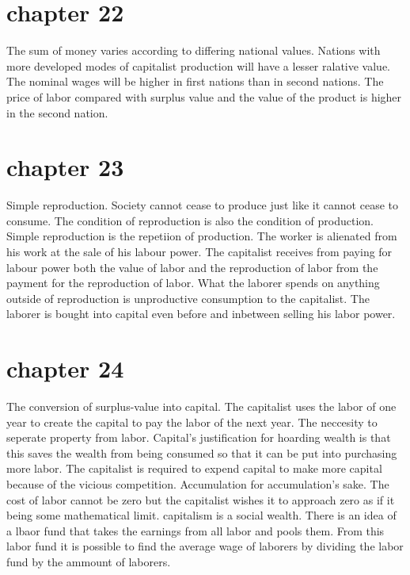 \documentclass{article}
\begin{document}
\section{chapter 22}
The sum of money varies according to differing national values. Nations with more developed modes of capitalist production will have a lesser ralative value. The nominal wages will be higher in first nations than in second nations. The price of labor compared with surplus value and the value of the product is higher in the second nation. 

\section{chapter 23}
Simple reproduction. Society cannot cease to produce just like it cannot cease to consume. The condition of reproduction is also the condition of production. Simple reproduction is the repetiion of production. The worker is alienated from his work at the sale of his labour power. The capitalist receives from paying for labour power both the value of labor and the reproduction of labor from the payment for the reproduction of labor. What the laborer spends on anything outside of reproduction is unproductive consumption to the capitalist. The laborer is bought into capital even before and inbetween selling his labor power.

\section{chapter 24}
The conversion of surplus-value into capital. The capitalist uses the labor of one year to create the capital to pay the labor of the next year. The neccesity to seperate property from labor. Capital's justification for hoarding wealth is that this saves the wealth from being consumed so that it can be put into purchasing more labor. The capitalist is required to expend capital to make more capital because of the vicious competition. Accumulation for accumulation's sake. The cost of labor cannot be zero but the capitalist wishes it to approach zero as if it being some mathematical limit. capitalism is a social wealth. There is an idea of a lbaor fund that takes the earnings from all labor and pools them. From this labor fund it is possible to find the average wage of laborers by dividing the labor fund by the ammount of laborers.
\end{document}

